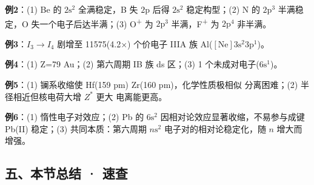 \textbf{例2}：(1) Be 的 \(2\mathrm{s}^2\) 全满稳定，B 失 \(2\mathrm{p}\) 后得 \(2\mathrm{s}^2\) 稳定构型；(2) N 的 \(2\mathrm{p}^3\) 半满稳定，O 失一个电子后达半满；(3) O\textsuperscript{+} 为 \(2\mathrm{p}^3\) 半满，F\textsuperscript{+} 为 \(2\mathrm{p}^4\) 非半满。

\textbf{例3}：\(I_3 \to I_4\) 剧增至 11575(4.2×) 个价电子 \箭 IIIA 族 \箭 Al(\([\mathrm{Ne}]3\mathrm{s}^2 3\mathrm{p}^1\))。

\textbf{例4}：(1) Z=79 \箭 Au；(2) 第六周期 IB 族 ds 区；(3) 1 个未成对电子(\(6\mathrm{s}^1\))。

\textbf{例5}：(1) 镧系收缩使 Hf(159 pm)  Zr(160 pm)，化学性质极相似 \箭 分离困难；(2) 半径相近但核电荷大增 \箭 \(Z^*\) 更大 \箭 电离能更高。

\textbf{例6}：(1) 惰性电子对效应；(2) Pb 的 \(6\mathrm{s}^2\) 因相对论效应显著收缩，不易参与成键 \箭 Pb(II) 稳定；(3) 共同本质：第六周期 \(n\mathrm{s}^2\) 电子对的相对论稳定化，随 \(n\) 增大而增强。

\subsection{五、本节总结 · 速查}\label{ux4e94ux672cux8282ux603bux7ed3-ux901fux67e5}

